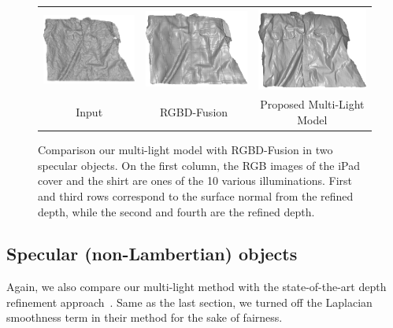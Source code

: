 \begin{figure}[!ht]
{\begin{tabular}{c|c c}
   \includegraphics[height = 0.23\linewidth]{figures/result/robust_patternShirt_shape_init.pdf} 
   &
   \includegraphics[height = 0.23\linewidth]{figures/result/rgbd_patternShirt_shape.pdf} &
   \includegraphics[height = 0.23\linewidth]{figures/result/robust_patternShirt_shape.pdf}\\

   {Input} & {RGBD-Fusion~\cite{or2015rgbd}} & {Proposed Multi-Light Model}               
 \end{tabular}}
\caption{Comparison our multi-light model with RGBD-Fusion in two specular objects. On the first column, the RGB images of the iPad cover and the shirt are ones of the 10 various illuminations. First and third rows correspond to the surface normal from the refined depth, while the second and fourth are the refined depth.}
\label{fig:comp_complicated_albedo}
\end{figure}

\subsection{Specular (non-Lambertian) objects}
Again, we also compare our multi-light method with the state-of-the-art depth refinement approach~\cite{or2015rgbd}.
Same as the last section, we turned off the Laplacian smoothness term in their method for the sake of fairness.

